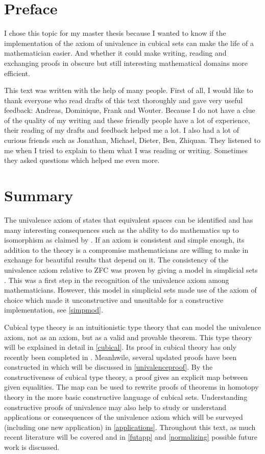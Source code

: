 \documentclass[12pt,a4paper,twoside,xetex]{book}
\begin{document}
\setcounter{page}{0}

\chapter*{Preface}

I chose this topic for my master thesis because I wanted to know if the implementation of the axiom of univalence in cubical sets can make the life of a mathematician easier. And whether it could make writing, reading and exchanging proofs in obscure but still interesting mathematical domains more efficient.

This text was written with the help of many people. First of all, I would like to thank everyone who read drafts of this text thoroughly and gave very useful feedback: Andreas, Dominique, Frank and Wouter. Because I do not have a clue of the quality of my writing and these friendly people have a lot of experience, their reading of my drafts and feedback helped me a lot. I also had a lot of curious friends such as Jonathan, Michael, Dieter, Ben, Zhiquan.  They listened to me when I tried to explain to them what I was reading or writing. Sometimes they asked questions which helped me even more.

\chapter*{Summary}


The univalence axiom of states that equivalent spaces can be identified and has many interesting consequences such as the ability to do mathematics up to isomorphism as claimed by \cite{Voevodsky2013}. If an axiom is consistent and simple enough, its addition to the theory is a compromise mathematicians are willing to make in exchange for beautiful results that depend on it. The  consistency of the univalence axiom relative to ZFC was proven by giving a model in simplicial sets \cite{Kapulkin2012}. This was a first step in the recognition of the univalence axiom among mathematicians. However, this model in simplicial sets made use of the axiom of choice which made it unconstructive and unsuitable for a constructive implementation, see \cref{simpmod}.

Cubical type theory is an intuitionistic type theory that can model the univalence axiom, not as an axiom, but as a valid and provable theorem. This type theory will be explained in detail in \cref{cubical}. Its proof in cubical theory has only recently been completed in \cite{Cohen2016}. Meanhwile, several updated proofs have been constructed in \cite{Sterling2018b, Moertberg2018} which will be discussed in \cref{univalenceproof}. By the constructiveness of cubical type theory, a proof gives an explicit map between given equalities. The map can be used to rewrite proofs of theorems in homotopy theory in the more basic constructive language of cubical sets. Understanding constructive proofs of univalence may also help to study or understand applications or consequences of the univalence axiom which will be surveyed (including one new application) in \cref{applications}. Throughout this text, as much recent literature will be covered and in \cref{futapp} and \cref{normalizing} possible future work is discussed.
\end{document}
